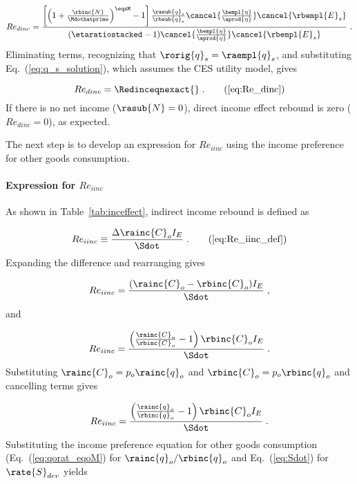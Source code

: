 \begin{equation}
  Re_{dinc} = \frac{\left[ \left( 1 + \frac{\rbinc{N}}{\Mdothatprime} \right) ^{\eqsM} - 1  \right] 
                  \frac{\rasub{q}_s}{\rbsub{q}_s}
                \cancel{\frac{\bempl{\eta}}{\aprod{\eta}}}
                \cancel{\rbempl{E}_s}}
              {\left( \etaratiostacked - 1 \right)\! 
                  \cancel{\frac{\bempl{\eta}}{\aprod{\eta}}} \cancel{\rbempl{E}_s}} \; .
\end{equation}
%
Eliminating terms, recognizing that 
$\rorig{q}_s = \raempl{q}_s$, and substituting Eq.~(\ref{eq:q_s_solution}), 
which assumes the CES utility model,
gives

\begin{equation} 
  Re_{dinc} = \Redinceqnexact{} \; . \tag{\ref{eq:Re_dinc}}
\end{equation}
%
If there is no net income ($\rasub{N} = 0$), 
direct income effect rebound is zero ($Re_{dinc} = 0$), as expected.

The next step is to develop an expression for $Re_{iinc}$
using the income preference for other goods consumption.


\paragraph{Expression for $Re_{iinc}$}
\label{sec:Re_iinc}

As shown in Table~\ref{tab:inceffect}, indirect income rebound is defined as

\begin{equation}
  Re_{iinc} \equiv \frac{\Delta \rainc{C}_o I_E}{\Sdot} \; . \tag{\ref{eq:Re_iinc_def}}
\end{equation}
%
Expanding the difference and rearranging gives

\begin{equation}
  Re_{iinc} = \frac{(\rainc{C}_o - \rbinc{C}_o) I_E}{\Sdot} \; , 
\end{equation}
%
and

\begin{equation}
  Re_{iinc} = \frac{\left( \frac{\rainc{C}_o}{\rbinc{C}_o} - 1  \right) \rbinc{C}_o I_E}{\Sdot} \; .
\end{equation}
%
Substituting $\rainc{C}_o = p_o \rainc{q}_o$ and $\rbinc{C}_o = p_o \rbinc{q}_o$ and
cancelling terms gives

\begin{equation}
  Re_{iinc} = \frac{\left( \frac{\rainc{q}_o}{\rbinc{q}_o} - 1  \right) \rbinc{C}_o I_E}{\Sdot} \; .
\end{equation}
%
Substituting the income preference equation for other goods consumption (Eq.~(\ref{eq:qorat_eqoM}) 
for $\rainc{q}_o / \rbinc{q}_o$
and Eq.~(\ref{eq:Sdot}) for $\rate{S}_{dev}$ yields

